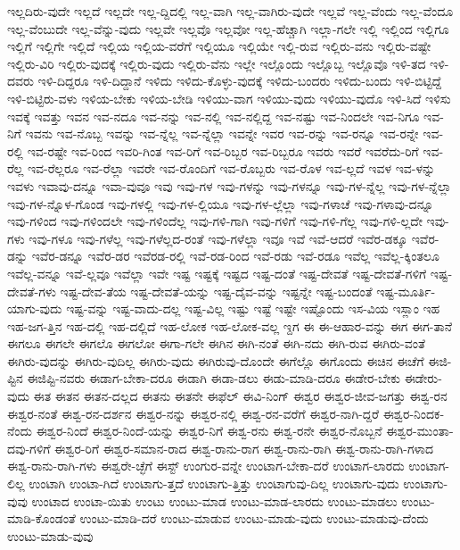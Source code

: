 {ಇಲ್ಲದಿರು-ವುದೇ
ಇಲ್ಲದೆ
ಇಲ್ಲದೇ
ಇಲ್ಲ-ದ್ದಿದಲ್ಲಿ
ಇಲ್ಲ-ವಾಗಿ
ಇಲ್ಲ-ವಾಗಿರು-ವುದೇ
ಇಲ್ಲವೆ
ಇಲ್ಲ-ವೆಂದು
ಇಲ್ಲ-ವೆಂದೂ
ಇಲ್ಲ-ವೆಂಬುದೇ
ಇಲ್ಲ-ವೆನ್ನು-ವುದು
ಇಲ್ಲವೇ
ಇಲ್ಲವೊ
ಇಲ್ಲವೋ
ಇಲ್ಲ-ಹೆಚ್ಚಾಗಿ
ಇಲ್ಲಾ-ಗಲೇ
ಇಲ್ಲಿ
ಇಲ್ಲಿಂದ
ಇಲ್ಲಿಗೂ
ಇಲ್ಲಿಗೆ
ಇಲ್ಲಿಗೇ
ಇಲ್ಲಿದೆ
ಇಲ್ಲಿಯ
ಇಲ್ಲಿಯ-ವರೆಗೆ
ಇಲ್ಲಿಯೂ
ಇಲ್ಲಿಯೇ
ಇಲ್ಲಿ-ರುವ
ಇಲ್ಲಿರು-ವನು
ಇಲ್ಲಿರು-ವಷ್ಟೇ
ಇಲ್ಲಿರು-ವಿರಿ
ಇಲ್ಲಿರು-ವುದಕ್ಕೆ
ಇಲ್ಲಿರು-ವುದು
ಇಲ್ಲಿರು-ವೆನು
ಇಲ್ಲೇ
ಇಲ್ಲೊಂದು
ಇಲ್ಲೊಬ್ಬ
ಇಲ್ಲೊವೊ
ಇಳಿ-ತದ
ಇಳಿ-ದವರು
ಇಳಿ-ದಿದ್ದರೂ
ಇಳಿ-ದಿದ್ದಾನೆ
ಇಳಿದು
ಇಳಿದು-ಕೊಳ್ಳು-ವುದಕ್ಕೆ
ಇಳಿದು-ಬಂದರು
ಇಳಿದು-ಬಂದು
ಇಳಿ-ಬಿಟ್ಟಿದ್ದೆ
ಇಳಿ-ಬಿಟ್ಟಿರು-ವಳು
ಇಳಿಯ-ಬೇಕು
ಇಳಿಯ-ಬೇಡಿ
ಇಳಿಯು-ವಾಗ
ಇಳಿಯು-ವುದು
ಇಳಿಯು-ವುದೊ
ಇಳಿ-ಸಿದೆ
ಇಳಿಸು
ಇವಕ್ಕೆ
ಇವತ್ತು
ಇವನ
ಇವ-ನದೂ
ಇವ-ನನ್ನು
ಇವ-ನಲ್ಲಿ
ಇವ-ನಲ್ಲಿದ್ದ
ಇವ-ನಷ್ಟು
ಇವ-ನಿಂದಲೇ
ಇವ-ನಿಗೂ
ಇವ-ನಿಗೆ
ಇವನು
ಇವ-ನೊಬ್ಬ
ಇವನ್ನು
ಇವ-ನ್ನೆಲ್ಲ
ಇವ-ನ್ನೆಲ್ಲಾ
ಇವನ್ನೇ
ಇವರ
ಇವ-ರನ್ನು
ಇವ-ರನ್ನೂ
ಇವ-ರನ್ನೇ
ಇವ-ರಲ್ಲಿ
ಇವ-ರಷ್ಟೇ
ಇವ-ರಿಂದ
ಇವರಿ-ಗಿಂತ
ಇವ-ರಿಗೆ
ಇವ-ರಿಬ್ಬರ
ಇವ-ರಿಬ್ಬರೂ
ಇವರು
ಇವರೆ
ಇವರೆದು-ರಿಗೆ
ಇವ-ರೆಲ್ಲ
ಇವ-ರೆಲ್ಲರೂ
ಇವ-ರೆಲ್ಲಾ
ಇವರೇ
ಇವ-ರೊಂದಿಗೆ
ಇವ-ರೊಬ್ಬರು
ಇವ-ರೊಳ
ಇವ-ಲ್ಲದೆ
ಇವಳ
ಇವ-ಳನ್ನು
ಇವಳು
ಇವಾವು-ದನ್ನೂ
ಇವಾ-ವುವೂ
ಇವು
ಇವು-ಗಳ
ಇವು-ಗಳನ್ನು
ಇವು-ಗಳನ್ನೂ
ಇವು-ಗಳ-ನ್ನೆಲ್ಲ
ಇವು-ಗಳ-ನ್ನೆಲ್ಲಾ
ಇವು-ಗಳ-ನ್ನೊಳ-ಗೊಂಡ
ಇವು-ಗಳಲ್ಲಿ
ಇವು-ಗಳ-ಲ್ಲಿಯೂ
ಇವು-ಗಳ-ಲ್ಲೆಲ್ಲಾ
ಇವು-ಗಳಾಚೆ
ಇವು-ಗಳಾವು-ದನ್ನೂ
ಇವು-ಗಳಿಂದ
ಇವು-ಗಳಿಂದಲೇ
ಇವು-ಗಳಿಂದೆಲ್ಲ
ಇವು-ಗಳಿ-ಗಾಗಿ
ಇವು-ಗಳಿಗೆ
ಇವು-ಗಳಿ-ಗೆಲ್ಲ
ಇವು-ಗಳಿ-ಲ್ಲದೇ
ಇವು-ಗಳು
ಇವು-ಗಳೂ
ಇವು-ಗಳೆಲ್ಲ
ಇವು-ಗಳೆಲ್ಲದ-ರಂತೆ
ಇವು-ಗಳೆಲ್ಲಾ
ಇವೂ
ಇವೆ
ಇವೆ-ಆದರೆ
ಇವೆರ-ಡಕ್ಕೂ
ಇವೆರ-ಡನ್ನು
ಇವೆರ-ಡನ್ನೂ
ಇವೆರ-ಡರ
ಇವೆರಡ-ರಲ್ಲಿ
ಇವೆ-ರಡ-ರಿಂದ
ಇವೆ-ರಡು
ಇವೆ-ರಡೂ
ಇವೆಲ್ಲ
ಇವೆಲ್ಲ-ಕ್ಕಿಂತಲೂ
ಇವೆಲ್ಲ-ವನ್ನೂ
ಇವೆ-ಲ್ಲವೂ
ಇವೆಲ್ಲಾ
ಇವೇ
ಇಷ್ಟ
ಇಷ್ಟಕ್ಕೆ
ಇಷ್ಟದ
ಇಷ್ಟ-ದಂತೆ
ಇಷ್ಟ-ದೇವತೆ
ಇಷ್ಟ-ದೇವತೆ-ಗಳಿಗೆ
ಇಷ್ಟ-ದೇವತೆ-ಗಳು
ಇಷ್ಟ-ದೇವ-ತೆಯ
ಇಷ್ಟ-ದೇವತೆ-ಯನ್ನು
ಇಷ್ಟ-ದೈವ-ವನ್ನು
ಇಷ್ಟನ್ನೇ
ಇಷ್ಟ-ಬಂದಂತೆ
ಇಷ್ಟ-ಮೂರ್ತಿ-ಯಾಗು-ವುದು
ಇಷ್ಟ-ವನ್ನು
ಇಷ್ಟ-ವಾದು-ದಲ್ಲ
ಇಷ್ಟ-ವಿಲ್ಲ
ಇಷ್ಟು
ಇಷ್ಟೆ
ಇಷ್ಟೇ
ಇಷ್ಟೊಂದು
ಇಸ-ವಿಯ
ಇಸ್ಲಾಂ
ಇಹ
ಇಹ-ಜಗ-ತ್ತಿನ
ಇಹ-ದಲ್ಲಿ
ಇಹ-ದಲ್ಲಿದೆ
ಇಹ-ಲೋಕ
ಇಹ-ಲೋಕ-ವಲ್ಲ
ಇ್ದಗ
ಈ
ಈ-ಆಹಾರ-ವನ್ನು
ಈಗ
ಈಗ-ತಾನೆ
ಈಗಲೂ
ಈಗಲೇ
ಈಗಲೊ
ಈಗಲೋ
ಈಗಾ-ಗಲೇ
ಈಗಿನ
ಈಗಿ-ನಂತೆ
ಈಗಿ-ನದು
ಈಗಿ-ರುವ
ಈಗಿರು-ವಂತೆ
ಈಗಿರು-ವುದನ್ನು
ಈಗಿರು-ವುದಿಲ್ಲ
ಈಗಿರು-ವುದು
ಈಗಿರುವು-ದೊಂದೇ
ಈಗೆಲ್ಲೊ
ಈಗೊಂದು
ಈಚಿನ
ಈಚೆಗೆ
ಈಜಿ-ಪ್ಟಿನ
ಈಜಿಪ್ಟಿ-ನವರು
ಈಡಾಗ-ಬೇಕಾ-ದರೂ
ಈಡಾಗಿ
ಈಡಾ-ಡಲು
ಈಡು-ಮಾಡಿ-ದರೂ
ಈಡೇರ-ಬೇಕು
ಈಡೇರು-ವುದು
ಈತ
ಈತನ
ಈತನ-ದಲ್ಲದ
ಈತನು
ಈತನೇ
ಈಫೆಲ್
ಈವಿ-ನಿಂಗ್
ಈಶ್ವರ
ಈಶ್ವರ-ಜೀವ-ಜಗತ್ತು
ಈಶ್ವ-ರನ
ಈಶ್ವರ-ನಂತೆ
ಈಶ್ವ-ರನ-ದರ್ಶನ
ಈಶ್ವರ-ನನ್ನು
ಈಶ್ವರ-ನಲ್ಲಿ
ಈಶ್ವ-ರನ-ವರೆಗೆ
ಈಶ್ವರ-ನಾಗಿ-ದ್ದರೆ
ಈಶ್ವರ-ನಿಂದಕ-ನೆಂದು
ಈಶ್ವರ-ನಿಂದೆ
ಈಶ್ವರ-ನಿಂದೆ-ಯನ್ನು
ಈಶ್ವರ-ನಿಗೆ
ಈಶ್ವ-ರನು
ಈಶ್ವ-ರನೇ
ಈಶ್ವರ-ನೊಬ್ಬನೆ
ಈಶ್ವರ-ಮುಂತಾ-ದವು-ಗಳಿಗೆ
ಈಶ್ವರ-ರಿಗೆ
ಈಶ್ವರ-ಸಮಾನ-ರಾದ
ಈಶ್ವ-ರಾನು-ರಾಗ
ಈಶ್ವ-ರಾನು-ರಾಗಿ
ಈಶ್ವ-ರಾನು-ರಾಗಿ-ಗಳಾದ
ಈಶ್ವ-ರಾನು-ರಾಗಿ-ಗಳು
ಈಶ್ವರೇ-ಚ್ಛೆಗೆ
ಈಸ್ಟ್
ಉಂಗುರ-ವನ್ನೇ
ಉಂಟಾಗ-ಬೇಕಾ-ದರೆ
ಉಂಟಾಗ-ಲಾರದು
ಉಂಟಾಗ-ಲಿಲ್ಲ
ಉಂಟಾಗಿ
ಉಂಟಾ-ಗಿದೆ
ಉಂಟಾಗು-ತ್ತದೆ
ಉಂಟಾಗು-ತ್ತಿತ್ತು
ಉಂಟಾಗುವು-ದಿಲ್ಲ
ಉಂಟಾಗು-ವುದು
ಉಂಟಾಗು-ವುವು
ಉಂಟಾದ
ಉಂಟಾ-ಯಿತು
ಉಂಟು
ಉಂಟು-ಮಾಡ
ಉಂಟು-ಮಾಡ-ಲಾರದು
ಉಂಟು-ಮಾಡಲು
ಉಂಟು-ಮಾಡಿ-ಕೊಂಡಂತೆ
ಉಂಟು-ಮಾಡಿ-ದರೆ
ಉಂಟು-ಮಾಡುವ
ಉಂಟು-ಮಾಡು-ವುದು
ಉಂಟು-ಮಾಡುವು-ದೆಂದು
ಉಂಟು-ಮಾಡು-ವುವು
}
